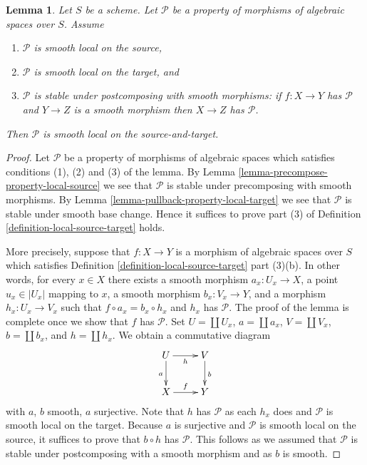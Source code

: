 \documentclass[10pt,a4paper]{amsart}
\theoremstyle{plain}
\newtheorem{lemma}[subsection]{Lemma}
\theoremstyle{definition}
\theoremstyle{remark}
\numberwithin{equation}{subsection}
\begin{document}
\begin{lemma}
\label{lemma-smooth-local-source-target}
Let $S$ be a scheme.
Let $\mathcal{P}$ be a property of morphisms of algebraic spaces over $S$.
Assume
\begin{enumerate}
\item $\mathcal{P}$ is smooth local on the source,
\item $\mathcal{P}$ is smooth local on the target, and
\item $\mathcal{P}$ is stable under postcomposing with smooth morphisms:
if $f : X \to Y$ has $\mathcal{P}$ and $Y \to Z$ is a smooth morphism
then $X \to Z$ has $\mathcal{P}$.
\end{enumerate}
Then $\mathcal{P}$ is smooth local on the source-and-target.
\end{lemma}

\begin{proof}
Let $\mathcal{P}$ be a property of morphisms of algebraic spaces which
satisfies conditions (1), (2) and (3) of the lemma. By
Lemma \ref{lemma-precompose-property-local-source}
we see that $\mathcal{P}$ is stable under precomposing with
smooth morphisms. By
Lemma \ref{lemma-pullback-property-local-target}
we see that $\mathcal{P}$ is stable under smooth base change.
Hence it suffices to prove part (3) of
Definition \ref{definition-local-source-target}
holds.

\medskip\noindent
More precisely, suppose that $f : X \to Y$ is a morphism
of algebraic spaces over $S$ which satisfies
Definition \ref{definition-local-source-target} part (3)(b).
In other words, for every $x \in X$ there exists a smooth
morphism $a_x : U_x \to X$, a point $u_x \in |U_x|$ mapping to $x$,
a smooth morphism $b_x : V_x \to Y$, and a morphism $h_x : U_x \to V_x$
such that $f \circ a_x = b_x \circ h_x$ and $h_x$ has $\mathcal{P}$.
The proof of the lemma is complete once we show that $f$ has $\mathcal{P}$.
Set $U = \coprod U_x$, $a = \coprod a_x$, $V = \coprod V_x$,
$b = \coprod b_x$, and $h = \coprod h_x$. We obtain a
commutative diagram
$$
\xymatrix{
U \ar[d]_a \ar[r]_h & V \ar[d]^b \\
X \ar[r]^f & Y
}
$$
with $a$, $b$ smooth, $a$ surjective. Note that $h$ has $\mathcal{P}$
as each $h_x$ does and $\mathcal{P}$ is smooth local on the target.
Because $a$ is surjective and $\mathcal{P}$ is smooth local on the source,
it suffices to prove that $b \circ h$ has $\mathcal{P}$.
This follows as we assumed that $\mathcal{P}$ is stable under
postcomposing with a smooth morphism and as $b$ is smooth.
\end{proof}
\end{document}
